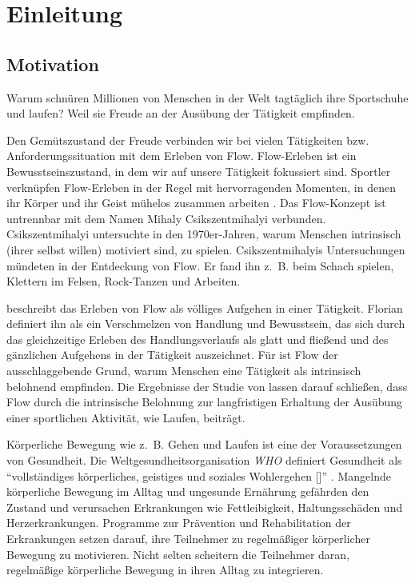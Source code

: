 \chapter{Einleitung}
\section{Motivation}

Warum schnüren Millionen von Menschen in der Welt tagtäglich ihre Sportschuhe und laufen? Weil sie Freude an der Ausübung der Tätigkeit empfinden.

Den Gemütszustand der Freude verbinden wir bei vielen Tätigkeiten bzw. Anforderungssituation mit dem Erleben von Flow. Flow-Erleben ist ein Bewusstseinszustand, in dem wir auf unsere Tätigkeit fokussiert sind. Sportler verknüpfen Flow-Erleben in der Regel mit hervorragenden Momenten, in denen ihr Körper und ihr Geist mühelos zusammen arbeiten \citep[S.~5]{Jackson1999}. Das Flow-Konzept ist untrennbar mit dem Namen Mihaly Csikszentmihalyi verbunden. Csikszentmihalyi untersuchte in den 1970er-Jahren, warum Menschen intrinsisch (ihrer selbst willen) motiviert sind, zu spielen. Csikszentmihalyis Untersuchungen mündeten in der Entdeckung von Flow. Er fand ihn z.~B. beim Schach spielen, Klettern im Felsen, Rock-Tanzen und Arbeiten.

\citet[][S.~58~f.]{Csikszentmihalyi2010} beschreibt das Erleben von Flow als völliges Aufgehen in einer Tätigkeit. Florian \citet[][S.~13]{Henk2014} definiert ihn als ein Verschmelzen von Handlung und Bewusstsein, das sich durch das gleichzeitige Erleben des Handlungsverlaufs als glatt und fließend und des gänzlichen Aufgehens in der Tätigkeit auszeichnet. Für \citet[][S.~602]{Csikszentmihalyi2005} ist Flow der ausschlaggebende Grund, warum Menschen eine Tätigkeit als intrinsisch belohnend empfinden. Die Ergebnisse der Studie von \citet[][S.~174]{Schuler2009} lassen darauf schließen, dass Flow durch die intrinsische Belohnung zur langfristigen Erhaltung der Ausübung einer sportlichen Aktivität, wie Laufen, beiträgt.

Körperliche Bewegung wie z.~B. Gehen und Laufen ist eine der Voraussetzungen von Gesundheit. Die Weltgesundheitsorganisation \emph{\ac{WHO}} definiert Gesundheit als "`vollständiges körperliches, geistiges und soziales Wohlergehen [\textellipsis]"' \citep[S.~100]{WorldHealthOrganization1948}. Mangelnde körperliche Bewegung im Alltag und ungesunde Ernährung gefährden den Zustand und verursachen Erkrankungen wie Fettleibigkeit, Haltungsschäden und Herzerkrankungen. Programme zur Prävention und Rehabilitation der Erkrankungen setzen darauf, ihre Teilnehmer zu regelmäßiger körperlicher Bewegung zu motivieren. Nicht selten scheitern die Teilnehmer daran, regelmäßige körperliche Bewegung in ihren Alltag zu integrieren.

